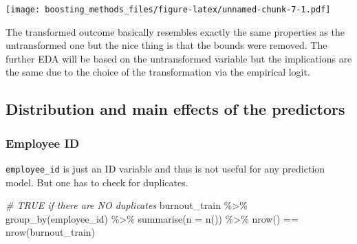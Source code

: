 \documentclass[
]{book}
\newenvironment{Shaded}{\begin{snugshade}}{\end{snugshade}}
\newcommand{\AttributeTok}[1]{\textcolor[rgb]{0.77,0.63,0.00}{#1}}
\newcommand{\CommentTok}[1]{\textcolor[rgb]{0.56,0.35,0.01}{\textit{#1}}}
\newcommand{\FloatTok}[1]{\textcolor[rgb]{0.00,0.00,0.81}{#1}}
\newcommand{\FunctionTok}[1]{\textcolor[rgb]{0.00,0.00,0.00}{#1}}
\newcommand{\NormalTok}[1]{#1}
\newcommand{\OtherTok}[1]{\textcolor[rgb]{0.56,0.35,0.01}{#1}}
\newcommand{\SpecialCharTok}[1]{\textcolor[rgb]{0.00,0.00,0.00}{#1}}
\begin{document}
\begin{Shaded}
\end{Shaded}

\texttt{[image: boosting\_methods\_files/figure-latex/unnamed-chunk-7-1.pdf]}

The transformed outcome basically resembles exactly the same properties as the untransformed one but the nice thing is that the bounds were removed. The further EDA will be based on the untransformed variable but the implications are the same due to the choice of the transformation via the empirical logit.

\hypertarget{distribution-and-main-effects-of-the-predictors}{%
\subsection{Distribution and main effects of the predictors}\label{distribution-and-main-effects-of-the-predictors}}

\hypertarget{employee-id}{%
\subsubsection{Employee ID}\label{employee-id}}

\texttt{employee\_id} is just an ID variable and thus is not useful for any prediction model. But one has to check for duplicates.

\begin{Shaded}
\begin{Highlighting}[]
\CommentTok{\# TRUE if there are NO duplicates}
\NormalTok{burnout\_train }\SpecialCharTok{\%\textgreater{}\%}
  \FunctionTok{group\_by}\NormalTok{(employee\_id) }\SpecialCharTok{\%\textgreater{}\%}
  \FunctionTok{summarise}\NormalTok{(}\AttributeTok{n =} \FunctionTok{n}\NormalTok{()) }\SpecialCharTok{\%\textgreater{}\%}
  \FunctionTok{nrow}\NormalTok{() }\SpecialCharTok{==} \FunctionTok{nrow}\NormalTok{(burnout\_train)}
\end{Highlighting}
\end{Shaded}
\end{document}
